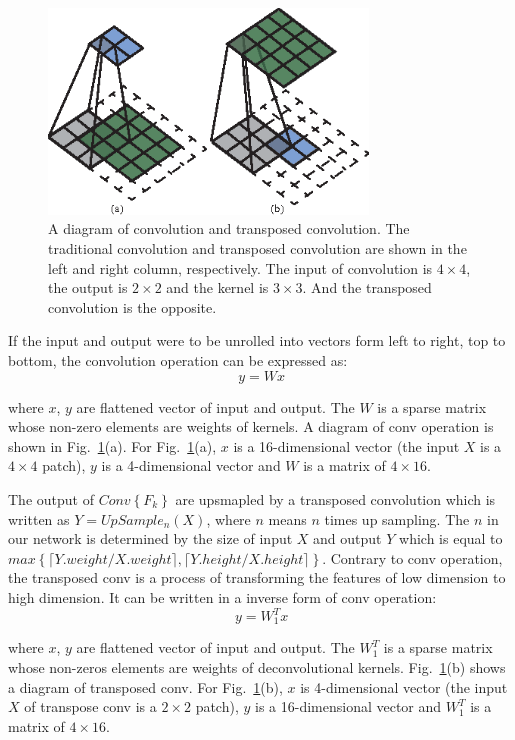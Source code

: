 \begin{figure}
\centering
\includegraphics[width=8.5cm]{Figures/Conv_Deconv.eps}
\caption{A diagram of convolution and transposed convolution. The traditional convolution and transposed convolution are shown in the left and right column, respectively.
 The input of convolution is ${4\times4}$, the output is ${2\times2}$ and the kernel is ${3\times3}$. And the transposed convolution is the opposite.}
\label{fig:Deconv}
\end{figure}

If the input and output were to be unrolled into vectors form left to right, top to bottom, the convolution operation can be expressed as:
 \begin{equation}
    \label{Conv_matrix}
    \ y = Wx
\end{equation}

where ${x}$, ${y}$ are flattened vector of input and output. The ${W}$ is a sparse matrix whose non-zero elements are weights of kernels.
A diagram of conv operation is shown in Fig.~\ref{fig:Deconv}(a).
For Fig.~\ref{fig:Deconv}(a), ${x}$ is a 16-dimensional vector (the input ${X}$ is a ${4\times4}$ patch), ${y}$ is a 4-dimensional vector and ${W}$ is a matrix of ${4\times16}$.


The output of ${Conv\left\{F_{k}\right\}}$ are upsmapled by a transposed convolution which is written as ${Y = UpSample_n(X)}$, where ${n}$ means ${n}$ times up sampling. The ${n}$ in our network is determined by the size of input $X$ and output $Y$ which is equal to ${max\left\{\lceil Y.weight/X.weight\rceil , \lceil Y.height/X.height\rceil \right\}}$.  Contrary to conv operation, the transposed conv is a process of transforming the features of low dimension to high dimension. It can be written in a inverse form of conv operation:
\begin{equation}
    \label{Conv_matrix}
    \ y = W_1^Tx
\end{equation}

where ${x}$, ${y}$ are flattened vector of input and output. The ${W_1^T}$ is a sparse matrix whose non-zeros elements are weights of deconvolutional kernels.
Fig.~\ref{fig:Deconv}(b) shows a diagram of transposed conv.
For Fig.~\ref{fig:Deconv}(b), ${x}$ is 4-dimensional vector (the input ${X}$ of transpose conv is a ${2\times2}$ patch), ${y}$ is a 16-dimensional vector and ${W_1^T}$ is a matrix of ${4\times16}$.

